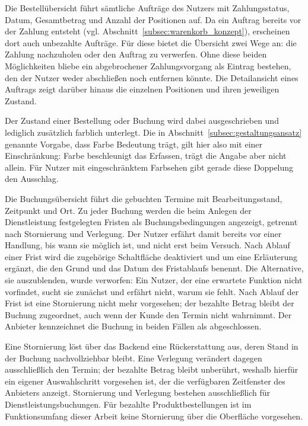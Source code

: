 Die Bestellübersicht führt sämtliche Aufträge des Nutzers mit
Zahlungsstatus, Datum, Gesamtbetrag und Anzahl der Positionen auf. Da
ein Auftrag bereits vor der Zahlung entsteht (vgl.
Abschnitt~\ref{subsec:warenkorb_konzept}), erscheinen dort auch
unbezahlte Aufträge. Für diese bietet die Übersicht zwei Wege an: die
Zahlung nachzuholen oder den Auftrag zu verwerfen. Ohne diese beiden
Möglichkeiten bliebe ein abgebrochener Zahlungsvorgang als Eintrag
bestehen, den der Nutzer weder abschließen noch entfernen könnte. Die
Detailansicht eines Auftrags zeigt darüber hinaus die einzelnen
Positionen und ihren jeweiligen Zustand.

Der Zustand einer Bestellung oder Buchung wird dabei ausgeschrieben
und lediglich zusätzlich farblich unterlegt. Die in
Abschnitt~\ref{subsec:gestaltungsansatz} genannte Vorgabe, dass Farbe
Bedeutung trägt, gilt hier also mit einer Einschränkung: Farbe
beschleunigt das Erfassen, trägt die Angabe aber nicht allein. Für
Nutzer mit eingeschränktem Farbsehen gibt gerade diese Doppelung den
Ausschlag.

Die Buchungsübersicht führt die gebuchten Termine mit
Bearbeitungsstand, Zeitpunkt und Ort. Zu jeder Buchung werden die
beim Anlegen der Dienstleistung festgelegten Fristen als
Buchungsbedingungen angezeigt, getrennt nach Stornierung und
Verlegung. Der Nutzer erfährt damit bereits vor einer Handlung, bis
wann sie möglich ist, und nicht erst beim Versuch. Nach Ablauf einer
Frist wird die zugehörige Schaltfläche deaktiviert und um eine
Erläuterung ergänzt, die den Grund und das Datum des Fristablaufs
benennt. Die Alternative, sie auszublenden, wurde verworfen: Ein
Nutzer, der eine erwartete Funktion nicht vorfindet, sucht sie
zunächst und erfährt nicht, warum sie fehlt. Nach Ablauf der Frist ist eine
Stornierung nicht mehr vorgesehen; der bezahlte Betrag bleibt der
Buchung zugeordnet, auch wenn der Kunde den Termin nicht wahrnimmt.
Der Anbieter kennzeichnet die Buchung in beiden Fällen als
abgeschlossen.

Eine Stornierung löst über das Backend eine Rückerstattung aus, deren
Stand in der Buchung nachvollziehbar bleibt. Eine Verlegung verändert
dagegen ausschließlich den Termin; der bezahlte Betrag bleibt
unberührt, weshalb hierfür ein eigener Auswahlschritt vorgesehen ist,
der die verfügbaren Zeitfenster des Anbieters anzeigt. Stornierung und Verlegung
bestehen ausschließlich für Dienstleistungsbuchungen. Für bezahlte
Produktbestellungen ist im Funktionsumfang dieser Arbeit keine
Stornierung über die Oberfläche vorgesehen.

